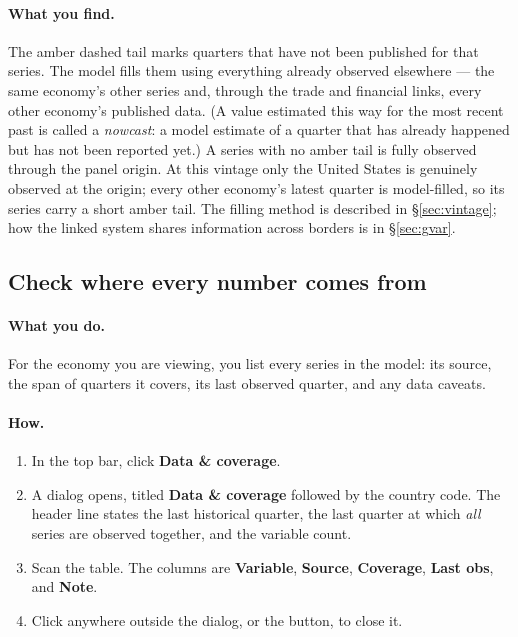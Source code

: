 \documentclass[11pt]{article}
\theoremstyle{definition}
\theoremstyle{remark}
\begin{document}
\paragraph{What you find.}
The amber dashed tail marks quarters that have not been published for that series.
The model fills them using everything already observed elsewhere --- the same
economy's other series and, through the trade and financial links, every other
economy's published data. (A value estimated this way for the most recent past is
called a \emph{nowcast}: a model estimate of a quarter that has already happened
but has not been reported yet.) A series with no amber tail is fully observed
through the panel origin. At this vintage only the United States is genuinely
observed at the origin; every other economy's latest quarter is model-filled, so
its series carry a short amber tail. The filling method is described in
\S\ref{sec:vintage}; how the linked system shares information across borders is in
\S\ref{sec:gvar}.

\subsection{Check where every number comes from}

\paragraph{What you do.}
For the economy you are viewing, you list every series in the model: its source,
the span of quarters it covers, its last observed quarter, and any data caveats.

\paragraph{How.}
\begin{enumerate}
  \item In the top bar, click \textbf{Data \& coverage}.
  \item A dialog opens, titled \textbf{Data \& coverage} followed by the country
    code. The header line states the last historical quarter, the last quarter at
    which \emph{all} series are observed together, and the variable count.
  \item Scan the table. The columns are \textbf{Variable}, \textbf{Source},
    \textbf{Coverage}, \textbf{Last obs}, and \textbf{Note}.
  \item Click anywhere outside the dialog, or the \textbf{\texttimes} button, to
    close it.
\end{enumerate}
\end{document}
